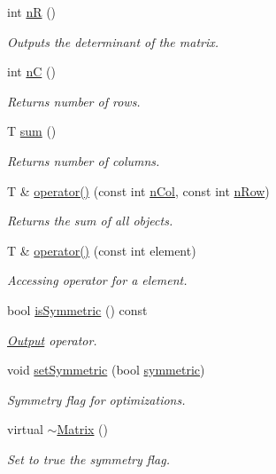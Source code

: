 \begin{DoxyCompactItemize}
int \hyperlink{singletonMatrix_a8e38d0aac1a8a82ae00e2fb5328b114c}{n\+R} ()
\begin{DoxyCompactList}\small\item\em Outputs the determinant of the matrix. \end{DoxyCompactList}\item 
int \hyperlink{singletonMatrix_abe6a17af941c66a1cceade934996c696}{n\+C} ()
\begin{DoxyCompactList}\small\item\em Returns number of rows. \end{DoxyCompactList}\item 
T \hyperlink{singletonMatrix_a00f833a52561b2665f3e93f254d363ac}{sum} ()
\begin{DoxyCompactList}\small\item\em Returns number of columns. \end{DoxyCompactList}\item 
T \& \hyperlink{singletonMatrix_a3f74c738d77726e6e63b61cc8ee19525}{operator()} (const int \hyperlink{singletonMatrix_aa3b73b40cb492b1a2b73c94fc5c3e212}{n\+Col}, const int \hyperlink{singletonMatrix_a18ad6163c76247e0c007c48d18e62afa}{n\+Row})
\begin{DoxyCompactList}\small\item\em Returns the sum of all objects. \end{DoxyCompactList}\item 
T \& \hyperlink{singletonMatrix_ab490c4125fa561019bdc81cf7c55b02a}{operator()} (const int element)
\begin{DoxyCompactList}\small\item\em Accessing operator for a element. \end{DoxyCompactList}\item 
bool \hyperlink{singletonMatrix_abe9c889826b481f9bd55b692df4caaf4}{is\+Symmetric} () const 
\begin{DoxyCompactList}\small\item\em \hyperlink{classOutput}{Output} operator. \end{DoxyCompactList}\item 
void \hyperlink{singletonMatrix_a384a4255276f138ce28dc2718cbd35a1}{set\+Symmetric} (bool \hyperlink{singletonMatrix_af2bf28cc007514273c14f89975438701}{symmetric})
\begin{DoxyCompactList}\small\item\em Symmetry flag for optimizations. \end{DoxyCompactList}\item 
virtual \hyperlink{singletonMatrix_a91aa704de674203e96aece9e1955ccd3}{$\sim$\+Matrix} ()
\begin{DoxyCompactList}\small\item\em Set to true the symmetry flag. \end{DoxyCompactList}\end{DoxyCompactItemize}
